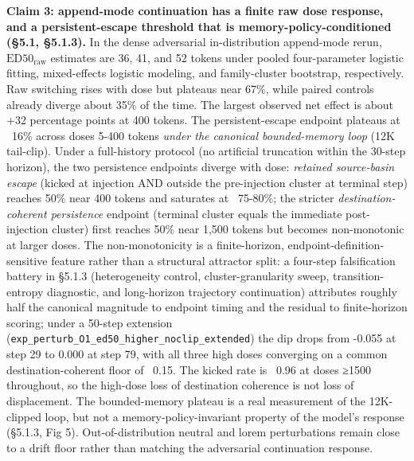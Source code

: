 \documentclass{article}
\theoremstyle{plain}
\theoremstyle{definition}
\begin{document}
\textbf{Claim 3: append-mode continuation has a finite raw dose response, and a persistent-escape threshold that is memory-policy-conditioned (§5.1, §5.1.3).} In the dense adversarial in-distribution append-mode rerun, $\mathrm{ED50}_{\mathrm{raw}}$ estimates are 36, 41, and 52 tokens under pooled four-parameter logistic fitting, mixed-effects logistic modeling, and family-cluster bootstrap, respectively. Raw switching rises with dose but plateaus near 67\%, while paired controls already diverge about 35\% of the time. The largest observed net effect is about +32 percentage points at 400 tokens. The persistent-escape endpoint plateaus at ~16\% across doses 5-400 tokens \textit{under the canonical bounded-memory loop} (12K tail-clip). Under a full-history protocol (no artificial truncation within the 30-step horizon), the two persistence endpoints diverge with dose: \textit{retained source-basin escape} (kicked at injection AND outside the pre-injection cluster at terminal step) reaches 50\% near 400 tokens and saturates at ~75-80\%; the stricter \textit{destination-coherent persistence} endpoint (terminal cluster equals the immediate post-injection cluster) first reaches 50\% near 1,500 tokens but becomes non-monotonic at larger doses. The non-monotonicity is a finite-horizon, endpoint-definition-sensitive feature rather than a structural attractor split: a four-step falsification battery in §5.1.3 (heterogeneity control, cluster-granularity sweep, transition-entropy diagnostic, and long-horizon trajectory continuation) attributes roughly half the canonical magnitude to endpoint timing and the residual to finite-horizon scoring; under a 50-step extension (\texttt{exp\_perturb\_O1\_ed50\_higher\_noclip\_extended}) the dip drops from -0.055 at step 29 to 0.000 at step 79, with all three high doses converging on a common destination-coherent floor of ~0.15. The kicked rate is ~0.96 at doses ≥1500 throughout, so the high-dose loss of destination coherence is not loss of displacement. The bounded-memory plateau is a real measurement of the 12K-clipped loop, but not a memory-policy-invariant property of the model's response (§5.1.3, Fig 5). Out-of-distribution neutral and lorem perturbations remain close to a drift floor rather than matching the adversarial continuation response.
\end{document}
